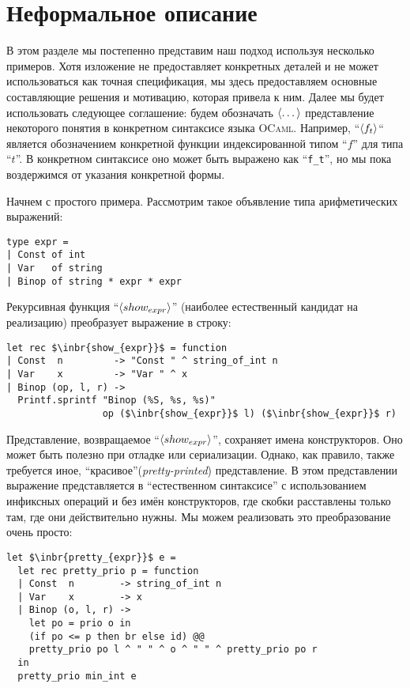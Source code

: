 \section{Неформальное описание}
\label{expo}

В этом разделе мы постепенно представим наш подход используя несколько примеров. 
Хотя изложение не предоставляет конкретных деталей и не может использоваться как точная спецификация,
мы здесь предоставляем основные составляющие решения и мотивацию, которая привела к ним.
Далее мы будет использовать следующее соглашение: будем обозначать $\left<\dots\right>$ представление некоторого понятия в конкретном синтаксисе языка \textsc{OCaml}. Например, ``$\left<f_t\right>$`` является обозначением конкретной функции индексированной типом  ``$f$'' для типа ``$t$''. 
В конкретном синтаксисе оно может быть выражено как ``\lstinline{f_t}'', но мы пока воздержимся от указания конкретной формы.

Начнем с простого примера. Рассмотрим такое объявление типа арифметических выражений:

\begin{lstlisting}
type expr =
| Const of int
| Var   of string
| Binop of string * expr * expr
\end{lstlisting}

Рекурсивная функция ``$\left<show_{expr}\right>$'' (наиболее естественный кандидат на реализацию)
преобразует выражение в строку: 

\begin{lstlisting}
let rec $\inbr{show_{expr}}$ = function
| Const  n         -> "Const " ^ string_of_int n
| Var    x         -> "Var " ^ x
| Binop (op, l, r) ->
  Printf.sprintf "Binop (%S, %s, %s)" 
                 op ($\inbr{show_{expr}}$ l) ($\inbr{show_{expr}}$ r)
\end{lstlisting}

Представление, возвращаемое ``$\left<show_{expr}\right>$'', сохраняет имена конструкторов. Оно может быть
полезно при отладке или сериализации. Однако, как правило, также требуется иное, ``красивое''(\emph{pretty-printed}) представление. 
В этом представлении выражение представляется в ``естественном синтаксисе'' с использованием инфиксных операций и без имён 
конструкторов, где скобки расставлены только там, где они действительно нужны. Мы можем реализовать это преобразование 
очень просто:

\begin{lstlisting}
let $\inbr{pretty_{expr}}$ e =
  let rec pretty_prio p = function
  | Const  n        -> string_of_int n
  | Var    x        -> x
  | Binop (o, l, r) ->
    let po = prio o in
    (if po <= p then br else id) @@
    pretty_prio po l ^ " " ^ o ^ " " ^ pretty_prio po r
  in
  pretty_prio min_int e
\end{lstlisting}

